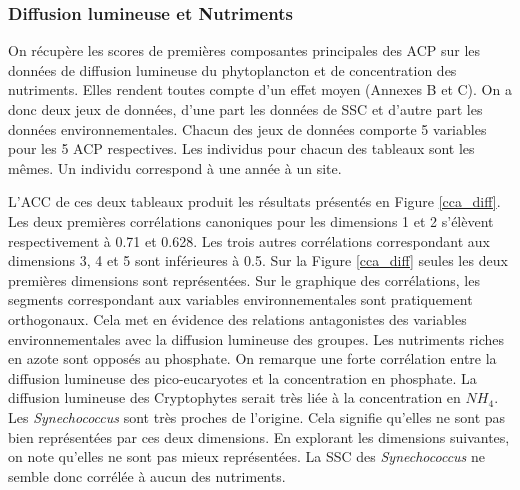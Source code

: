 \documentclass[12pt]{article}
\begin{document}
\subsubsection{Diffusion lumineuse et Nutriments}

On récupère les scores de premières composantes principales des ACP sur les données de diffusion lumineuse du phytoplancton et de concentration des nutriments. Elles rendent toutes compte d’un effet moyen (Annexes B et C). On a donc deux jeux de données, d’une part les données de SSC et d’autre part les données environnementales. Chacun des jeux de données comporte 5 variables pour les 5 ACP respectives. Les individus pour chacun des tableaux sont les mêmes. Un individu correspond à une année à un site.

L’ACC de ces deux tableaux produit les résultats présentés en Figure \ref{cca_diff}. Les deux premières corrélations canoniques pour les dimensions 1 et 2 s’élèvent respectivement à 0.71 et 0.628.  Les trois autres corrélations correspondant aux dimensions 3, 4 et 5 sont inférieures à 0.5. Sur la Figure \ref{cca_diff} seules les deux premières dimensions sont représentées. Sur le graphique des corrélations, les segments correspondant aux variables environnementales sont pratiquement orthogonaux. Cela met en évidence des relations antagonistes des variables environnementales avec la diffusion lumineuse des groupes. Les nutriments riches en azote sont opposés au phosphate.  On remarque une forte corrélation entre la diffusion lumineuse des pico-eucaryotes et la concentration en phosphate. La diffusion lumineuse des Cryptophytes serait très liée à la concentration en $NH_4$. Les \textit{Synechococcus} sont très proches de l’origine. Cela signifie qu’elles ne sont pas bien représentées par ces deux dimensions. En explorant les dimensions suivantes, on note qu’elles ne sont pas mieux représentées. La SSC des \textit{Synechococcus} ne semble donc corrélée à aucun des nutriments.
\end{document}
